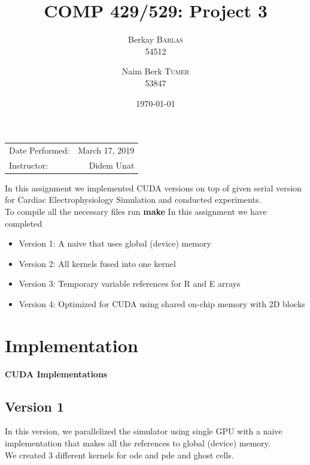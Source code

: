 \documentclass{article}
\title{COMP 429/529: Project 3} %
\author{
  Berkay \textsc{Barlas} \\54512
  \and
  Naim Berk \textsc{Tumer} \\53847
}
\date{\today} %
\newcommand\tab[1][0.5cm]{\hspace*{#1}}
\begin{document}
\maketitle %

\begin{center}
\begin{tabular}{l r}
Date Performed: & March 17, 2019 \\ %
Instructor: & Didem Unat %
\end{tabular}
\end{center}



\tab In this assignment we implemented CUDA versions
on top of given serial version for Cardiac Electrophysiology Simulation and conducted experiments. 
\\ \tab  To compile all the necessary files run \textbf{make}
\newline
In this assignment we have completed
\begin{itemize}
    \item Version 1: A naive that uses global (device) memory
    \item Version 2: All kernels fused into one kernel
    \item Version 3: Temporary variable references for R and E arrays 
    \item Version 4: Optimized for CUDA using shared on-chip memory with 2D blocks 
\end{itemize}

\section{Implementation}
\textbf{CUDA Implementations}

\subsection{Version 1}
\tab In this version, we parallelized the simulator using single GPU with a naive implementation that makes all the references to global (device) memory. 
\\ We created 3 different kernels for ode and pde and ghost cells.
\end{document}
